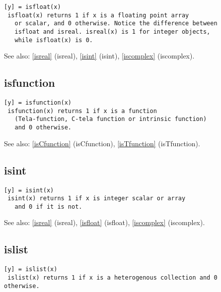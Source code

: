 \documentclass[a4paper]{article}
\begin{document}
\begin{tscreen}
\begin{verbatim}
[y] = isfloat(x)
 isfloat(x) returns 1 if x is a floating point array
   or scalar, and 0 otherwise. Notice the difference between
   isfloat and isreal. isreal(x) is 1 for integer objects,
   while isfloat(x) is 0.
\end{verbatim}

See also: \ref{isreal} {(isreal)}, \ref{isint} {(isint)}, \ref{iscomplex} {(iscomplex)}.
\end{tscreen}



\subsection{isfunction\label{isfunction}}

\begin{tscreen}
\begin{verbatim}
[y] = isfunction(x)
 isfunction(x) returns 1 if x is a function
   (Tela-function, C-tela function or intrinsic function)
   and 0 otherwise.
\end{verbatim}

See also: \ref{isCfunction} {(isCfunction)}, \ref{isTfunction} {(isTfunction)}.
\end{tscreen}



\subsection{isint\label{isint}}

\begin{tscreen}
\begin{verbatim}
[y] = isint(x)
 isint(x) returns 1 if x is integer scalar or array
   and 0 if it is not.
\end{verbatim}

See also: \ref{isreal} {(isreal)}, \ref{isfloat} {(isfloat)}, \ref{iscomplex} {(iscomplex)}.
\end{tscreen}



\subsection{islist\label{islist}}

\begin{tscreen}
\begin{verbatim}
[y] = islist(x)
 islist(x) returns 1 if x is a heterogenous collection and 0 otherwise. 
\end{verbatim}
\end{tscreen}
\end{document}
